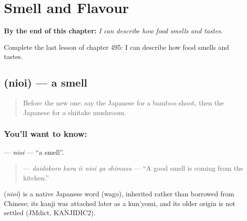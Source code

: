
\chapter{Smell and Flavour}
\label{ch:ja-smell-and-flavour}

\begin{chapteropening}
\textbf{By the end of this chapter:} \emph{I can describe how food smells and tastes.}

Complete the last lesson of chapter 495: I can describe how food smells and tastes.
\end{chapteropening}

\section[\texorpdfstring{\ja{におい} (nioi)}{におい (nioi)}]{ (nioi) — a smell}

\label{lesson:JA-C495-nioi}



\begin{quote}
Before the new one: say the Japanese for a bamboo shoot, then the Japanese for a shiitake mushroom.
\end{quote}

\subsection*{You'll want to know: }
\textbf{} — \emph{nioi} — \textquotedblleft{}a smell\textquotedblright{}.

\begin{quote}
\textbf{   } — \emph{daidokoro kara ii nioi ga shimasu} — \textquotedblleft{}A good smell is coming from the kitchen.\textquotedblright{}
\end{quote}

\begin{cousinweb}
\textbf{} (\emph{nioi}) is a native Japanese word (wago), inherited rather than borrowed from Chinese; its kanji was attached later as a kun'yomi, and its older origin is not settled (JMdict, KANJIDIC2).
\end{cousinweb}


